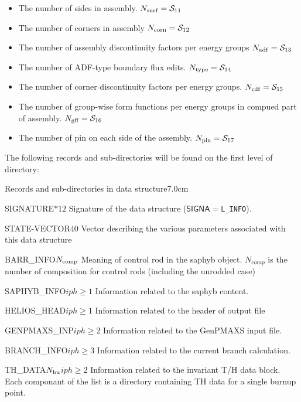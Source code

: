 \begin{itemize}
\item The number of sides in assembly. $N_{\rm surf} = \mathcal{S}_{11}$

\item The number of corners in assembly $N_{\rm corn} = \mathcal{S}_{12}$

\item The number of assembly discontinuity factors per energy groups $N_{\rm adf} = \mathcal{S}_{13}$

\item The number of ADF-type boundary flux edits. $N_{\rm type} = \mathcal{S}_{14}$

\item The number of corner discontinuity factors per energy groups. $N_{\rm cdf} = \mathcal{S}_{15}$

\item The number of group-wise form functions per energy groups in compued part of assembly. $N_{\rm gff} = \mathcal{S}_{16}$

\item The number of pin on each side of the assembly. $N_{\rm pin} = \mathcal{S}_{17}$



\end{itemize}
\clearpage
\noindent
The following records and sub-directories will be found on the first level of 
directory:

\begin{DescriptionEnregistrement}{Records and sub-directories
 in  data structure}{7.0cm} \label{tabl:tabinfo}

\CharEnr
 {SIGNATURE}{$*12$}
 {Signature of the  data structure ($\mathsf{SIGNA}=${\tt L\_INFO}).}

  \IntEnr
  {STATE-VECTOR}{$40$}
  { Vector describing the various parameters associated with this data structure}

\IntEnr
  {BARR\_INFO}{$N_{\rm comp}$}
  { Meaning of control rod in the saphyb object. $N_{comp}$ is the number of composition for control rods (including the unrodded case)}
  

  
\OptDirEnr
 {SAPHYB\_INFO}{$iph\geq 1$}
 {Information related to the saphyb content.}  
 
 \OptDirEnr
 {HELIOS\_HEAD}{$iph\geq 1$}
 {Information related to the header of output  file}  
 
 \OptDirEnr
 {GENPMAXS\_INP}{$iph\geq 2$}
 {Information related to the GenPMAXS input file.}  
 
 \OptDirEnr
 {BRANCH\_INFO}{$iph\geq 3$}
 {Information related to the current branch calculation.}  
 
 \OptDirlEnr
 {TH\_DATA}{$N_{\rm bu}$}{$iph\geq 2$}
 {Information related to the invariant T/H data block. Each componant of the list is a directory containing TH data for a single burnup point.}  

\end{DescriptionEnregistrement}


